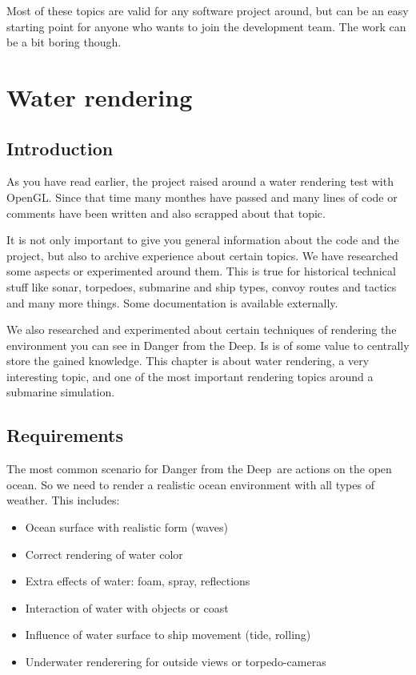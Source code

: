 \documentclass[english,a4paper,12pt]{report}
\newcommand{\dftd}{\textsf{Danger from the Deep}}
\begin{document}
    Most of these topics are valid for any software project around, but
    can be an easy starting point for anyone who wants to join the
    development team. The work can be a bit boring though.

\chapter{Water rendering}

\section{Introduction}

As you have read earlier, the project raised around a water rendering
test with OpenGL. Since that time many monthes have passed and many
lines of code or comments have been written and also scrapped about that
topic.

It is not only important to give you general information about the code
and the project, but also to archive experience about certain topics. We
have researched some aspects or experimented around them. This is true
for historical technical stuff like sonar, torpedoes, submarine and ship
types, convoy routes and tactics and many more things. Some
documentation is available externally.

We also researched and experimented about certain techniques of
rendering the environment you can see in \dftd. Is is of some value to
centrally store the gained knowledge. This chapter is about water
rendering, a very interesting topic, and one of the most important
rendering topics around a submarine simulation.

\section{Requirements}

The most common scenario for \dftd\ are actions on the open ocean. So we
need to render a realistic ocean environment with all types of weather.
This includes:

\begin{itemize}
\item Ocean surface with realistic form (waves)
\item Correct rendering of water color
\item Extra effects of water: foam, spray, reflections
\item Interaction of water with objects or coast
\item Influence of water surface to ship movement (tide, rolling)
\item Underwater renderering for outside views or torpedo-cameras
\end{itemize}
\end{document}

